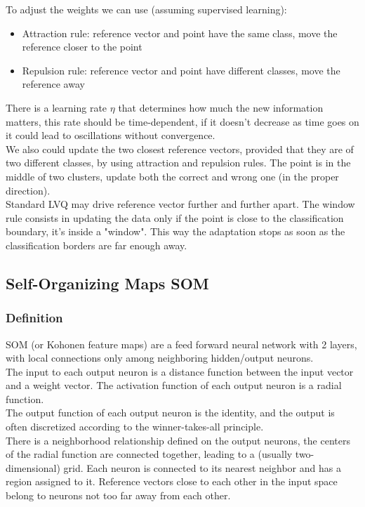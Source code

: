 To adjust the weights we can use (assuming supervised learning):
\begin{itemize}
	\item Attraction rule: reference vector and point have the same class, move the reference closer to the point
	\item Repulsion rule: reference vector and point have different classes, move the reference away
\end{itemize}
There is a learning rate $\eta$ that determines how much the new information matters, this rate should be time-dependent, if it doesn't decrease as time goes on it could lead to oscillations without convergence.\\

We also could update the two closest reference vectors, provided that they are of two different classes, by using attraction and repulsion rules. The point is in the middle of two clusters, update both the correct and wrong one (in the proper direction).\\

Standard LVQ may drive reference vector further and further apart. The window rule consists in updating the data only if the point is close to the classification boundary, it's inside a "window". This way the adaptation stops as soon as the classification borders are far enough away.\\

\subsection{Self-Organizing Maps SOM}

\subsubsection{Definition}
SOM (or Kohonen feature maps) are a feed forward neural network with 2 layers, with local connections only among neighboring hidden/output neurons.\\

The input to each output neuron is a distance function between the input vector and a weight vector. The activation function of each output neuron is a radial function.\\

The output function of each output neuron is the identity, and the output is often discretized according to the winner-takes-all principle.\\

There is a neighborhood relationship defined on the output neurons, the centers of the radial function are connected together, leading to a (usually two-dimensional) grid. Each neuron is connected to its nearest neighbor and has a region assigned to it. Reference vectors close to each other in the input space belong to neurons not too far away from each other.\\

